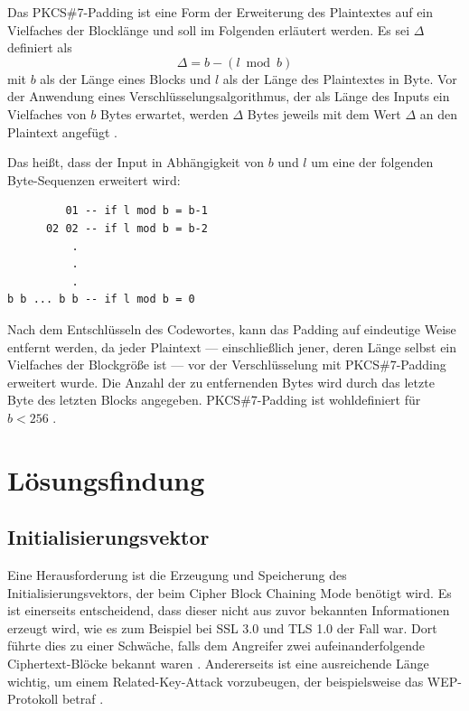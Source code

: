 \documentclass[course=erap]{aspdoc}
\begin{document}
Das PKCS\#7-Padding ist eine Form der Erweiterung des Plaintextes auf ein Vielfaches der Blocklänge und soll im Folgenden erläutert werden. Es sei $\Delta$ definiert als
\[
    \Delta = b - (l \bmod b)
\]
mit $b$ als der Länge eines Blocks und $l$ als der Länge des Plaintextes in Byte. Vor der Anwendung eines Verschlüsselungsalgorithmus, der als Länge des Inputs ein Vielfaches von $b$ Bytes erwartet, werden $\Delta$ Bytes jeweils mit dem Wert $\Delta$ an den Plaintext angefügt \cite[p.28]{rfc5652}.\bigbreak

Das heißt, dass der Input in Abhängigkeit von $b$ und $l$ um eine der folgenden Byte-Sequenzen erweitert wird:

\begin{samepage}
\begin{center}
\begin{varwidth}{\linewidth}
\begin{verbatim}
         01 -- if l mod b = b-1
      02 02 -- if l mod b = b-2
          .
          .
          .
b b ... b b -- if l mod b = 0
\end{verbatim}
\end{varwidth}
\end{center}
\end{samepage}

Nach dem Entschlüsseln des Codewortes, kann das Padding auf eindeutige Weise entfernt werden, da jeder Plaintext --- einschließlich jener, deren Länge selbst ein Vielfaches der Blockgröße ist --- vor der Verschlüsselung mit PKCS\#7-Padding erweitert wurde. Die Anzahl der zu entfernenden Bytes wird durch das letzte Byte des letzten Blocks angegeben. PKCS\#7-Padding ist wohldefiniert für $b < 256$ \cite[p.28]{rfc5652}.

\section{Lösungsfindung}

\subsection{Initialisierungsvektor}
\label{sec:Initialisierungsvektor}
Eine Herausforderung ist die Erzeugung und Speicherung des Initialisierungsvektors, der beim Cipher Block Chaining Mode benötigt wird. Es ist einerseits entscheidend, dass dieser nicht aus zuvor bekannten Informationen erzeugt wird, wie es zum Beispiel bei SSL 3.0 und TLS 1.0 der Fall war. Dort führte dies zu einer Schwäche, falls dem Angreifer zwei aufeinanderfolgende Ciphertext-Blöcke bekannt waren \cite{ssltls}. Andererseits ist eine ausreichende Länge wichtig, um einem Related-Key-Attack vorzubeugen, der beispielsweise das WEP-Protokoll betraf \cite{wep}.\bigbreak
\end{document}
